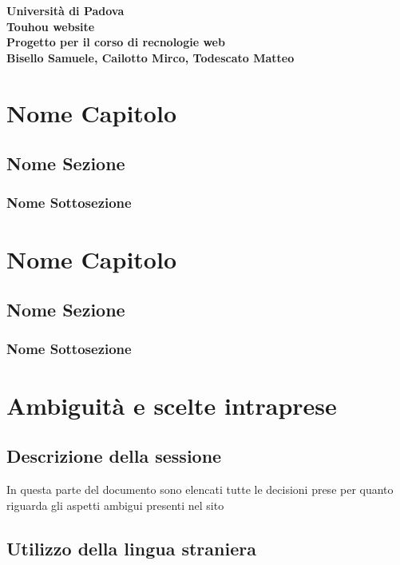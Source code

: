 \documentclass[openany, a4paper, 12pt]{report}
\begin{document}
	
	\begin{titlepage}
		\centering
		\vfill
		{
			\bfseries
			\vskip2cm
			\Large Università di Padova\\
			\vfill
			\Huge Touhou website\\
			\Large Progetto per il corso di recnologie web\\
			\vfill
			\large Bisello Samuele, Cailotto Mirco, Todescato Matteo\\
			\vfill
		}    
	\end{titlepage}
	\tableofcontents
	\newpage
	
	\chapter{Nome Capitolo}
	\section{Nome Sezione}
	\subsection{Nome Sottosezione}
	
	\chapter{Nome Capitolo}
	\section{Nome Sezione}
	\subsection{Nome Sottosezione}
	
	\chapter{Ambiguità e scelte intraprese}
		\section{Descrizione della sessione}
			In questa parte del documento sono elencati tutte le decisioni prese per quanto riguarda gli aspetti ambigui presenti nel sito\\
		\section{Utilizzo della lingua straniera}
\end{document}
